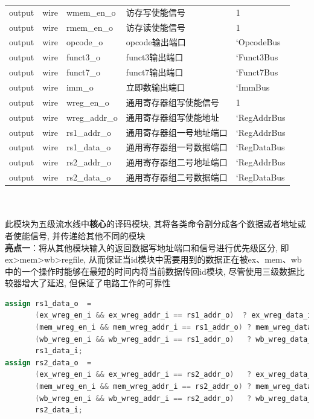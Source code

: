 \documentclass[lang=cn,11pt,a4paper,chinesefont=founder]{elegantpaper}
\begin{document}
\begin{tabular}{cclll}
    output   & wire     & wmem\_en\_o        & 访存写使能信号             & 1            \\
    output   & wire     & rmem\_en\_o        & 访存读使能信号             & 1            \\
    output   & wire     & opcode\_o          & opcode输出端口             & `OpcodeBus   \\
    output   & wire     & funct3\_o          & funct3输出端口             & `Funct3Bus   \\
    output   & wire     & funct7\_o          & funct7输出端口             & `Funct7Bus   \\
    output   & wire     & imm\_o             & 立即数输出端口             & `ImmBus      \\
    output   & wire     & wreg\_en\_o        & 通用寄存器组写使能信号     & 1            \\
    output   & wire     & wreg\_addr\_o      & 通用寄存器组写使能地址     & `RegAddrBus  \\
    output   & wire     & rs1\_addr\_o       & 通用寄存器组一号地址端口   & `RegAddrBus  \\
    output   & wire     & rs1\_data\_o       & 通用寄存器组一号数据端口   & `RegDataBus  \\
    output   & wire     & rs2\_addr\_o       & 通用寄存器组二号地址端口   & `RegAddrBus  \\
    output   & wire     & rs2\_data\_o       & 通用寄存器组二号数据端口   & `RegDataBus  \\
    \bottomrule
\end{tabular}\\
\\
此模块为五级流水线中\textbf{核心}的译码模块, 其将各类命令割分成各个数据或者地址或者使能信号, 并传递给其他不同的模块\\
\textbf{亮点一}：将从其他模块输入的返回数据写地址端口和信号进行优先级区分, 即ex>mem>wb>regfile, 从而保证当id模块中需要用到的数据正在被ex、mem、wb中的一个操作时能够在最短的时间内将当前数据传回id模块, 尽管使用三级数据比较器增大了延迟, 但保证了电路工作的可靠性\\
\begin{lstlisting}[language=verilog]
assign rs1_data_o  = 
	   (ex_wreg_en_i && ex_wreg_addr_i == rs1_addr_o)  ? ex_wreg_data_i  :
	   (mem_wreg_en_i && mem_wreg_addr_i == rs1_addr_o) ? mem_wreg_data_i :
	   (wb_wreg_en_i && wb_wreg_addr_i == rs1_addr_o)   ? wb_wreg_data_i  :
	   rs1_data_i;
assign rs2_data_o  = 
	   (ex_wreg_en_i && ex_wreg_addr_i == rs2_addr_o)   ? ex_wreg_data_i  :
	   (mem_wreg_en_i && mem_wreg_addr_i == rs2_addr_o) ? mem_wreg_data_i :
	   (wb_wreg_en_i && wb_wreg_addr_i == rs2_addr_o)   ? wb_wreg_data_i  :
	   rs2_data_i;
\end{lstlisting}
\end{document}
